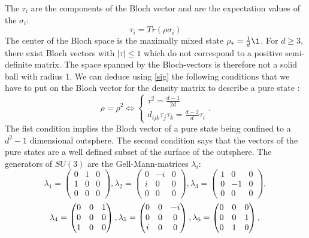 \noindent The $\tau_i$ are the components of the Bloch vector and are the expectation values of the $\sigma_i$:
$$
	 \tau_i = Tr(\rho\sigma_i)
$$
The center of the Bloch space is the maximally mixed state $\rho_{*}=\frac{1}{d}\1$.
For $d\ge3$, there exist Bloch vectors with $\left|\tau\right|\le 1$ which do not correspond to a positive semi-definite matrix.
The space spanned by the Bloch-vectors is therefore not a solid ball with radius $1$.
We can deduce using \eqref{sig} the following conditions that we have to put on the Bloch vector for the density matrix to describe a pure state \cite{bengtsson17}:
\[
\rho=\rho^2\Leftrightarrow \begin{cases}
	\tau^2=\frac{d-1}{2d}\\
	d_{ijk}\tau_j\tau_k=\frac{d-2}{d}\tau_i
\end{cases}
.\]
The fist condition implies the Bloch vector of a pure state being confined to a $d^2-1$ dimensional outsphere.
The second condition says that the vectors of the pure states are a well defined subset of the surface of the outsphere.
The generators of  $SU(3)$ are the Gell-Mann-matrices $\lambda_i$: \[
\lambda_1=\begin{pmatrix} 0 & 1 & 0 \\ 1 & 0 & 0 \\ 0 & 0 & 0 \end{pmatrix},
\lambda_2=\begin{pmatrix} 0 & -i & 0 \\ i & 0 & 0 \\ 0 & 0 & 0 \end{pmatrix},
\lambda_3=\begin{pmatrix} 1 & 0 & 0 \\ 0 & -1 & 0 \\ 0 & 0 & 0 \end{pmatrix},
\] \[
\lambda_4=\begin{pmatrix} 0 & 0 & 1 \\ 0 & 0 & 0 \\ 1 & 0 & 0 \end{pmatrix},
\lambda_5=\begin{pmatrix} 0 & 0 & -i \\ 0 & 0 & 0 \\ i & 0 & 0 \end{pmatrix},
\lambda_6=\begin{pmatrix} 0 & 0 & 0 \\ 0 & 0 & 1 \\ 0 & 1 & 0 \end{pmatrix},\\
\]
